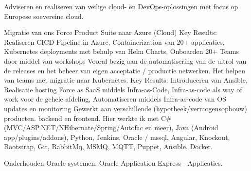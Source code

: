 \documentclass[
	a4paper
]{babelviscv}
\begin{document}
\makefrontsidebar


	\begin{cvtable}[0.5]
			{Adviseren en realiseren van veilige cloud- en DevOps-oplossingen met focus op Europese soevereine cloud.}
	\end{cvtable}
	\begin{cvtable}[0.5]
			{Migratie van ons Force Product Suite naar Azure (Cloud)}
			\cvitemlist
				{Key Results:}
					{Realiseren CICD Pipeline in Azure, Containerization van 20+ applicaties, Kubernetes deployments met behulp van Helm Charts, Onboarden 20+ Teams door middel van workshops}
			{Vooral bezig aan de automatisering van de uitrol van de releases en het beheer van eigen acceptatie / productie netwerken. Het helpen van teams met migratie naar Kubernetes.}
			\cvitemlist
				{Key Results:}
					{Introduceren van Ansible, Realisatie hosting Force as SaaS middels Infra-as-Code, Infra-as-code als way of work voor de gehele afdeling, Automatiseren middels Infra-as-code van OS updates en monitoring}
			{Gewerkt aan verschillende (hypotheek/vermogensopbouw) producten. backend en frontend. 
			\newline
			Hier werkte ik met C\# (MVC/ASP.NET/NHibernate/Spring/Autofac en meer), Java (Android app/plugins/addons), Python, Jenkins, Oracle / mssql, Angular, Knockout, Bootstrap, Git, RabbitMq, MSMQ, MQTT, Puppet, Ansible, Docker.}
	\end{cvtable}
	\begin{cvtable}[0.5]
			{Onderhouden Oracle systemen.}
			{Oracle Application Express - Applicaties.}
	\end{cvtable}
\newpage
\makebacksidebar
\end{document}
